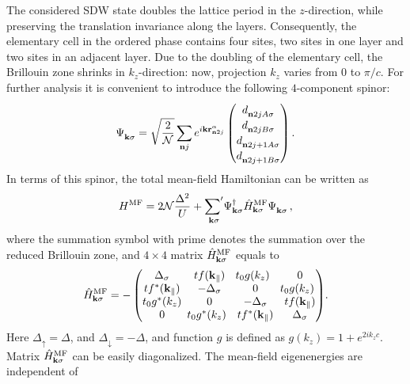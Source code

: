 \documentclass[prb,twocolumn,showpacs,aps,superscriptaddress,floatfix]{revtex4}
\begin{document}
The considered SDW state doubles the lattice period in the
$z$-direction,
while preserving the translation invariance along the layers. Consequently,
the elementary cell in the ordered phase contains four sites, two sites in
one layer and two sites in an adjacent layer. Due to the doubling of the
elementary cell, the Brillouin zone shrinks in
$k_z$-direction:
now, projection
$k_z$
varies from $0$ to
$\pi/c$.
For further analysis it is convenient to introduce the following
$4$-component
spinor:
\begin{equation}
\Psi_{\mathbf{k}\sigma}^{\phantom{\dag}}
=
\sqrt{\frac{2}{\cal N}}
\sum_{\mathbf{n}j}e^{i\mathbf{kr}_{\mathbf{n}2j}^{\alpha}}
\begin{pmatrix}
d_{\mathbf{n}2jA\sigma}^{\phantom{\dag}}\\
d_{\mathbf{n}2jB\sigma}^{\phantom{\dag}}\\
d_{\mathbf{n}2j+1A\sigma}^{\phantom{\dag}}\\
d_{\mathbf{n}2j+1B\sigma}^{\phantom{\dag}}
\end{pmatrix}.
\end{equation}
In terms of this spinor, the total mean-field Hamiltonian can be written as
\begin{equation}
H^{\rm MF}
=
2{\cal{N}}\frac{\Delta^2}{U}
+
\mathop{{\sum}'}_{\mathbf{k}\sigma}\!
	\Psi_{\mathbf{k}\sigma}^{\dag}
		\hat{H}^{\rm MF}_{\mathbf{k}\sigma}
	\Psi_{\mathbf{k}\sigma}^{\phantom{\dag}}\,,
\end{equation}
where the summation symbol with prime denotes the summation over the
reduced Brillouin zone, and
$4\times4$
matrix
$\hat{H}^{\rm MF}_{\mathbf{k}\sigma}$
equals to
\begin{equation}
\hat{H}^{\rm MF}_{\mathbf{k}\sigma}
=
-
\begin{pmatrix}
 \Delta_\sigma           & tf(\mathbf{k}_{\|})& \!\!\!t_0 g (k_z) &0                  \\
tf^*(\mathbf{k}_{\|}) &   -\Delta_\sigma   &        0
&\!\!\!t_0 g (k_z) \\
t_0 g^* (k_z)           &   0                &    -\Delta_\sigma         &tf(\mathbf{k}_{\|})\\
0                       &\!\!\!t_0 g^* (k_z) &   tf^*(\mathbf{k}_{\|}) & \Delta_\sigma
\end{pmatrix}\!.
\end{equation}
Here
$\Delta_{\uparrow}=\Delta$,
and
$\Delta_{\downarrow}=-\Delta$,
and function $g$ is defined as
$g(k_z) = 1 + e^{2ik_zc}$.
Matrix
$\hat{H}^{\rm MF}_{\mathbf{k}\sigma}$
can be easily diagonalized. The mean-field eigenenergies are independent of
\end{document}
